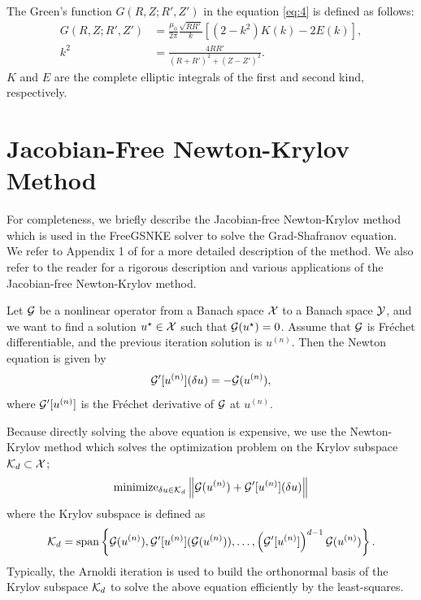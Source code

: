 \begin{appendix}
  The Green's function $G(R, Z; R', Z')$ in the equation \eqref{eq:4} is defined as follows:
  \begin{align*} G(R, Z; R', Z') &= \frac{\mu_0}{2 \pi} \frac{\sqrt{R R'}}{k} \left[
    (2 - k^2) K(k) - 2E(k) 
  \right], \\ k^2 &= \frac{4 R R'}{(R + R')^2 + (Z - Z')^2}. \end{align*}
  $K$ and $E$ are the complete elliptic integrals of the first and second kind, respectively.

  \section{Jacobian-Free Newton-Krylov Method}\label{sec:JFNK}

  For completeness, we briefly describe the Jacobian-free Newton-Krylov method 
  which is used in the FreeGSNKE solver to solve the Grad-Shafranov equation.
  We refer to Appendix 1 of \cite{freegsnke} for a more detailed description of the method.
  We also refer \cite{jfnksurvey} to the reader for a rigorous description 
  and various applications of the Jacobian-free Newton-Krylov method.

  Let $\cal{G}$ be a nonlinear operator from a Banach space $\cal{X}$ to a Banach space $\cal{Y}$,
  and we want to find a solution $u^\star \in \cal{X}$ such that $\cal{G}(u^\star) = 0$.
  Assume that $\cal{G}$ is Fréchet differentiable, and the previous iteration solution is $u^{(n)}$.
  Then the Newton equation is given by
  \[ \cal{G}'[u^{(n)}] (\delta u) = - \cal{G}(u^{(n)}), \]
  where $\cal{G}'[u^{(n)}]$ is the Fréchet derivative of $\cal{G}$ at $u^{(n)}$.

  Because directly solving the above equation is expensive, 
  we use the Newton-Krylov method which solves the optimization problem 
  on the Krylov subspace $\cal{K}_d \subset \cal{X}$;
  \begin{align} \label{eq:opt}
    \te{minimize}_{\delta u \in \cal{K}_d} \left\|\cal{G}(u^{(n)}) + 
  \cal{G}'[u^{(n)}] (\delta u) \right\| 
  \end{align}
  where the Krylov subspace is defined as
  \begin{align} \label{eq:krylov}
    \cal{K}_d = \te{span} \left\{
    \cal{G}(u^{(n)}), \cal{G}'[u^{(n)}] (\cal{G}(u^{(n)})), \ldots, 
    \left(\cal{G}'[u^{(n)}]\right)^{d-1} \cal{G}(u^{(n)}) 
    \right\}. 
  \end{align}
  Typically, the Arnoldi iteration is used to build the orthonormal basis of the 
  Krylov subspace $\cal{K}_d$ to solve the above equation efficiently
  by the least-squares.


\end{appendix}
